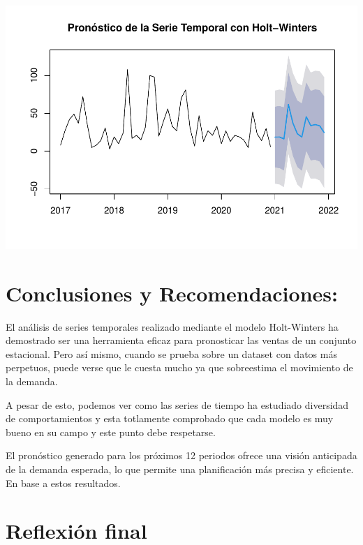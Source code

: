 \documentclass[
]{book}
\begin{document}
\includegraphics{_main_files/figure-latex/unnamed-chunk-27-1.pdf}

\section{\texorpdfstring{\textbf{Conclusiones y Recomendaciones:}}{Conclusiones y Recomendaciones:}}\label{conclusiones-y-recomendaciones}

El análisis de series temporales realizado mediante el modelo Holt-Winters ha demostrado ser una herramienta eficaz para pronosticar las ventas de un conjunto estacional. Pero así mismo, cuando se prueba sobre un dataset con datos más perpetuos, puede verse que le cuesta mucho ya que sobreestima el movimiento de la demanda.

A pesar de esto, podemos ver como las series de tiempo ha estudiado diversidad de comportamientos y esta totlamente comprobado que cada modelo es muy bueno en su campo y este punto debe respetarse.

El pronóstico generado para los próximos 12 periodos ofrece una visión anticipada de la demanda esperada, lo que permite una planificación más precisa y eficiente. En base a estos resultados.

\section{\texorpdfstring{\textbf{Reflexión final}}{Reflexión final}}\label{reflexiuxf3n-final}
\end{document}
